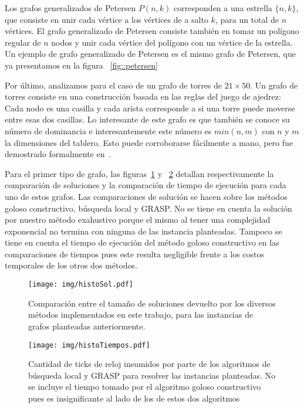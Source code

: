 Los grafos generalizados de Petersen $P(n,k)$ corresponden a una 
estrella $\{ n,k \}$, que consiste en unir cada v\'ertice a los 
v\'ertices de a salto $k$, para un total de $n$ v\'ertices. El grafo
generalizado de Petersen consiste tambi\'en en tomar un pol\'igono
regular de $n$ nodos y unir cada v\'ertice del pol\'igono con un 
v\'ertice de la estrella. Un ejemplo de grafo generalizado de Petersen
es el mismo grafo de Petersen, que ya presentamos en la figura
~\ref{fig::petersen}

Por \'ultimo, analizamos para el caso de un grafo de torres de 
$21 \times 50$. Un grafo de torres consiste en una construcci\'on basada
en las reglas del juego de ajedrez: Cada nodo es una casilla y cada 
arista corresponde a si una torre puede moverse entre esas dos casillas.
Lo interesante de este grafo es que tambi\'en se conoce su n\'umero de
dominancia e interesantemente este n\'umero es $min(n,m)$ con $n$ y $m$
la dimensiones del tablero. Esto puede corroborarse f\'acilmente a mano,
pero fue demostrado formalmente en~\cite{rookgraph}.

Para el primer tipo de grafo, las figuras~\ref{fig::histosol} y
~\ref{fig::histotiempos} detallan respectivamente la comparaci\'on
de soluciones y la comparaci\'on de tiempo de ejecuci\'on para cada
uno de estos grafos. Las comparaciones de soluci\'on se hacen sobre los
m\'etodos goloso constructivo, b\'usqueda local y GRASP. No se tiene en
cuenta la soluci\'on por nuestro m\'etodo exahustivo porque el mismo al
tener una complejidad exponencial no termina con ninguna de las instancia
planteadas. Tampoco se tiene en cuenta el tiempo de ejecuci\'on del 
m\'etodo goloso constructivo en las comparaciones de tiempos pues este
resulta negligible frente a los costos temporales de los otros dos
m\'etodos.

\begin{figure}[H]
	\caption{Comparaci\'on entre el tama\~no de soluciones devuelto por
	los diversos m\'etodos implementados en este trabajo, para las 
	instancias de grafos planteadas anteriormente.}
	\label{fig::histosol}
	\centering
	\texttt{[image: img/histoSol.pdf]}
\end{figure}

\begin{figure}[H]
	\caption{Cantidad de ticks de reloj insumidos por parte de los 
	algoritmos de b\'usqueda local y GRASP para resolver las 
	instancias planteadas. No se incluye el tiempo tomado por el 
	algoritmo goloso constructivo pues es insignificante al lado de los
	de estos dos algoritmos}
	\label{fig::histotiempos}
	\centering
	\texttt{[image: img/histoTiempos.pdf]}
\end{figure}

